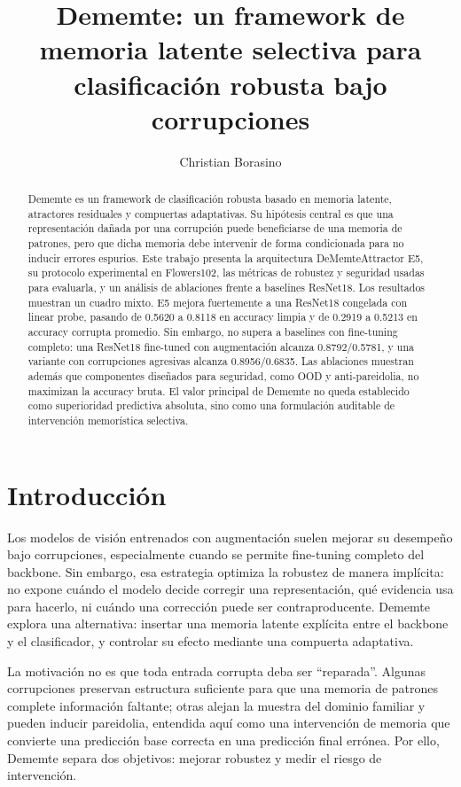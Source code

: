 \documentclass[11pt,a4paper]{article}
\title{\textbf{Dememte: un framework de memoria latente selectiva para clasificación robusta bajo corrupciones}}
\author{Christian Borasino}
\date{}
\begin{document}
\maketitle

\begin{abstract}
Dememte es un framework de clasificación robusta basado en memoria latente,
atractores residuales y compuertas adaptativas. Su hipótesis central es que una
representación dañada por una corrupción puede beneficiarse de una memoria de
patrones, pero que dicha memoria debe intervenir de forma condicionada para no
inducir errores espurios. Este trabajo presenta la arquitectura
DeMemteAttractor E5, su protocolo experimental en Flowers102, las métricas de
robustez y seguridad usadas para evaluarla, y un análisis de ablaciones frente a
baselines ResNet18. Los resultados muestran un cuadro mixto. E5 mejora
fuertemente a una ResNet18 congelada con linear probe, pasando de 0.5620 a
0.8118 en accuracy limpia y de 0.2919 a 0.5213 en accuracy corrupta promedio.
Sin embargo, no supera a baselines con fine-tuning completo: una ResNet18
fine-tuned con augmentación alcanza 0.8792/0.5781, y una variante con
corrupciones agresivas alcanza 0.8956/0.6835. Las ablaciones muestran además que
componentes diseñados para seguridad, como OOD y anti-pareidolia, no maximizan
la accuracy bruta. El valor principal de Dememte no queda establecido como
superioridad predictiva absoluta, sino como una formulación auditable de
intervención memorística selectiva.
\end{abstract}

\section{Introducción}

Los modelos de visión entrenados con augmentación suelen mejorar su desempeño
bajo corrupciones, especialmente cuando se permite fine-tuning completo del
backbone. Sin embargo, esa estrategia optimiza la robustez de manera implícita:
no expone cuándo el modelo decide corregir una representación, qué evidencia usa
para hacerlo, ni cuándo una corrección puede ser contraproducente. Dememte
explora una alternativa: insertar una memoria latente explícita entre el
backbone y el clasificador, y controlar su efecto mediante una compuerta
adaptativa.

La motivación no es que toda entrada corrupta deba ser ``reparada''. Algunas
corrupciones preservan estructura suficiente para que una memoria de patrones
complete información faltante; otras alejan la muestra del dominio familiar y
pueden inducir pareidolia, entendida aquí como una intervención de memoria que
convierte una predicción base correcta en una predicción final errónea. Por ello,
Dememte separa dos objetivos: mejorar robustez y medir el riesgo de intervención.
\end{document}
